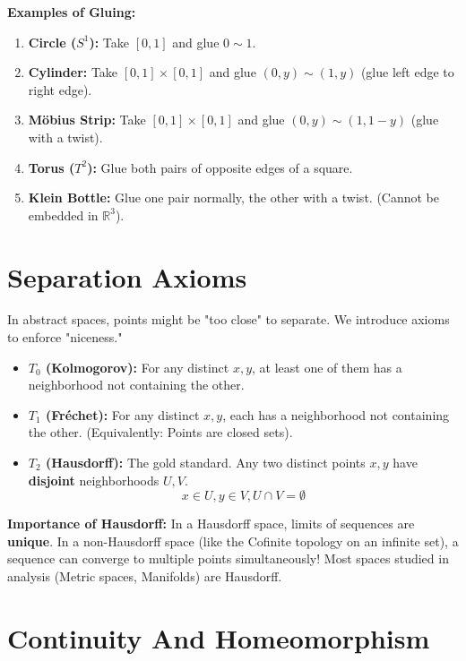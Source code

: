 \documentclass[oneside]{book}
\begin{document}
\textbf{Examples of Gluing:}
\begin{enumerate}
    \item \textbf{Circle ($S^1$):} Take $[0, 1]$ and glue $0 \sim 1$.
    \item \textbf{Cylinder:} Take $[0,1] \times [0,1]$ and glue $(0, y) \sim (1, y)$ (glue left edge to right edge).
    \item \textbf{Möbius Strip:} Take $[0,1] \times [0,1]$ and glue $(0, y) \sim (1, 1-y)$ (glue with a twist).
    \item \textbf{Torus ($T^2$):} Glue both pairs of opposite edges of a square.
    \item \textbf{Klein Bottle:} Glue one pair normally, the other with a twist. (Cannot be embedded in $\mathbb{R}^3$).
\end{enumerate}

\section{Separation Axioms}

In abstract spaces, points might be "too close" to separate. We introduce axioms to enforce "niceness."

\begin{itemize}
    \item \textbf{$T_0$ (Kolmogorov):} For any distinct $x, y$, at least one of them has a neighborhood not containing the other.
    \item \textbf{$T_1$ (Fréchet):} For any distinct $x, y$, each has a neighborhood not containing the other. (Equivalently: Points are closed sets).
    \item \textbf{$T_2$ (Hausdorff):} The gold standard. Any two distinct points $x, y$ have \textbf{disjoint} neighborhoods $U, V$.
    \[ x \in U, y \in V, U \cap V = \emptyset \]
\end{itemize}

\textbf{Importance of Hausdorff:} In a Hausdorff space, limits of sequences are \textbf{unique}. In a non-Hausdorff space (like the Cofinite topology on an infinite set), a sequence can converge to multiple points simultaneously! Most spaces studied in analysis (Metric spaces, Manifolds) are Hausdorff.

\section{Continuity And Homeomorphism}
\end{document}
